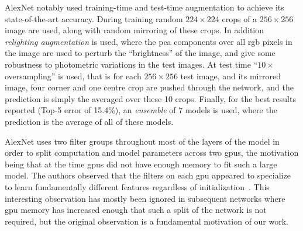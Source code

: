 \documentclass[thesis]{subfiles}
\begin{document}
AlexNet notably used training-time and test-time augmentation to achieve its state-of-the-art accuracy. During training random $224 \times 224$ crops of a $256 \times 256$ image are used, along with random mirroring of these crops. In addition \emph{relighting augmentation} is used, where the \gls{pca} components over all \gls{rgb} pixels in the image are used to perturb the ``brightness'' of the image, and give some robustness to photometric variations in the test images. At test time ``$10\times$ oversampling'' is used, that is for each $256\times 256$ test image, and its mirrored image, four corner and one centre crop are pushed through the network, and the prediction is simply the averaged over these 10 crops. Finally, for the best results reported (Top-5 error of 15.4\%), an \emph{ensemble} of 7 models is used, where the prediction is the average of all of these models. 

AlexNet uses two filter groups throughout most of the layers of the model in order to split computation and model parameters across two \gls{gpu}s, the motivation being that at the time \gls{gpu}s did not have enough memory to fit such a large model. The authors observed that the filters on each \gls{gpu} appeared to specialize to learn fundamentally different features regardless of initialization~\citep{Krizhevsky2012}. This interesting observation has mostly been ignored in subsequent networks where \gls{gpu} memory has increased enough that such a split of the network is not required, but the original observation is a fundamental motivation of our work.

\end{document}
